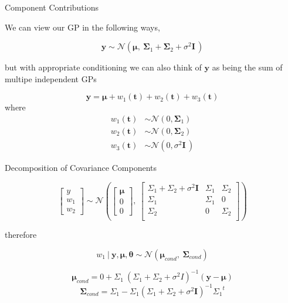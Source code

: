\documentclass[11pt,ignorenonframetext,]{beamer}
\begin{document}
\begin{frame}[t]{Component Contributions}
\protect\hypertarget{component-contributions}{}

We can view our GP in the following ways,

\[ \symbf{y} \sim \mathcal{N}(\symbf{\mu},~ \symbf{\Sigma}_1 + \symbf{\Sigma}_2 + \sigma^2 \symbf{I}\,) \]

but with appropriate conditioning we can also think of \(\symbf{y}\) as
being the sum of multipe independent GPs

\[ \symbf{y} = \symbf{\mu} + w_1(\symbf{t}) + w_2(\symbf{t}) + w_3(\symbf{t})\]
where \[
\begin{aligned}
w_1(\symbf{t}) &\sim \mathcal{N}(0, \symbf{\Sigma}_1) \\
w_2(\symbf{t}) &\sim \mathcal{N}(0, \symbf{\Sigma}_2) \\
w_3(\symbf{t}) &\sim \mathcal{N}(0, \sigma^2 \symbf{I}\,)
\end{aligned}
\]

\end{frame}

\begin{frame}[t]{Decomposition of Covariance Components}
\protect\hypertarget{decomposition-of-covariance-components}{}

\footnotesize

\[ \begin{bmatrix} 
y \\
w_1 \\
w_2
\end{bmatrix} 
\sim \mathcal{N} \left(
\begin{bmatrix}
\symbf{\mu} \\ 0 \\ 0
\end{bmatrix},~
\begin{bmatrix}
\Sigma_1 + \Sigma_2 + \sigma^2 \symbf{I} & \Sigma_1 & \Sigma_2 \\
\Sigma_1 & \Sigma_1 & 0\\
\Sigma_2 & 0  & \Sigma_2 \\
\end{bmatrix}
\right)
\]

\normalsize

therefore

\[ w_1 ~|~ \symbf{y},\symbf{\mu},\symbf{\theta} \sim \mathcal{N}(\symbf{\mu}_{cond},~ \symbf{\Sigma}_{cond}) \]

\[ \symbf{\mu}_{cond} = 0 + \Sigma_1 ~ (\Sigma_1 + \Sigma_2 + \sigma^2 I)^{-1}(\symbf{y}-\symbf{\mu}) \]
\[ \symbf{\Sigma}_{cond} = \Sigma_1 - \Sigma_1 (\Sigma_1 + \Sigma_2 + \sigma^2 \symbf{I})^{-1} {\Sigma_1}^t \]

\end{frame}
\end{document}
